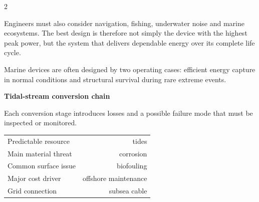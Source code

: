 \begin{multicols}{2}
\begin{ecarticle}
Engineers must also consider navigation, fishing, underwater noise and marine ecosystems. The best
design is therefore not simply the device with the highest peak power, but the system that delivers
dependable energy over its complete life cycle.
\end{ecarticle}

\begin{tcolorbox}[title=\sffamily\bfseries Engineering Insight,colback=yellow!10,colframe=ECOrange]
Marine devices are often designed by two operating cases: efficient energy capture in normal conditions
and structural survival during rare extreme events.
\end{tcolorbox}

\begin{engineeringfocus}
\textbf{Tidal-stream conversion chain}
\begin{center}
\end{center}
Each conversion stage introduces losses and a possible failure mode that must be inspected or monitored.
\end{engineeringfocus}

\begin{keyfigures}
\begin{tabularx}{\linewidth}{@{}Xr@{}}
Predictable resource & tides\\
Main material threat & corrosion\\
Common surface issue & biofouling\\
Major cost driver & offshore maintenance\\
Grid connection & subsea cable
\end{tabularx}
\end{keyfigures}


\end{multicols}

